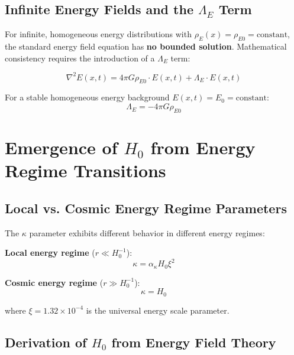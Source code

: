 \documentclass[12pt,a4paper]{article}
\newcommand{\Efield}{E(x,t)}
\newcommand{\xipar}{\xi}
\newcommand{\Hzero}{H_0}
\newcommand{\kappaparam}{\kappa}
\begin{document}
	\subsection{Infinite Energy Fields and the $\Lambda_E$ Term}
	
	For infinite, homogeneous energy distributions with $\rho_E(x) = \rho_{E0} = \text{constant}$, the standard energy field equation has \textbf{no bounded solution}. Mathematical consistency requires the introduction of a $\Lambda_E$ term:
	
	\begin{equation}
		\boxed{\nabla^2 \Efield = 4\pi G \rho_{E0} \cdot \Efield + \Lambda_E \cdot \Efield}
		\label{eq:modified_energy_field_equation}
	\end{equation}
	
	For a stable homogeneous energy background $\Efield = E_0 = \text{constant}$:
	\begin{equation}
		\boxed{\Lambda_E = -4\pi G \rho_{E0}}
		\label{eq:lambda_energy_value}
	\end{equation}
	
	\section{Emergence of $H_0$ from Energy Regime Transitions}
	
	\subsection{Local vs. Cosmic Energy Regime Parameters}
	
	The $\kappa$ parameter exhibits different behavior in different energy regimes:
	
	\textbf{Local energy regime} ($r \ll \Hzero^{-1}$):
	\begin{equation}
		\boxed{\kappaparam = \alpha_{\kappa} \Hzero \xipar^2}
		\label{eq:kappa_local_energy}
	\end{equation}
	
	\textbf{Cosmic energy regime} ($r \gg \Hzero^{-1}$):
	\begin{equation}
		\boxed{\kappaparam = \Hzero}
		\label{eq:kappa_cosmic_energy}
	\end{equation}
	
	where $\xipar = 1.32 \times 10^{-4}$ is the universal energy scale parameter.
	
	\subsection{Derivation of $H_0$ from Energy Field Theory}
	
\end{document}
